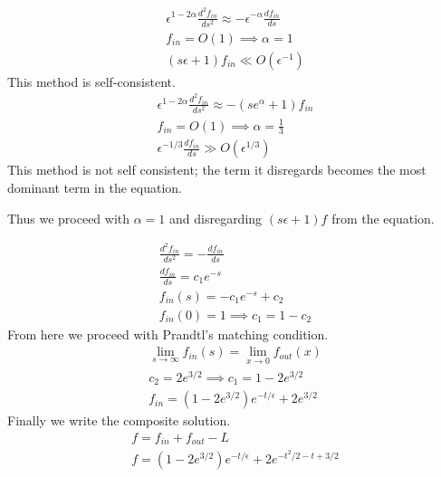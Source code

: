 \documentclass{article}
\begin{document}
\begin{enumerate}[label=\alph*.]
        \begin{gather*}
            \epsilon^{1-2\alpha}\frac{d^2f_{in}}{ds^2} \approx
            -\epsilon^{-\alpha}\frac{df_{in}}{ds} \\
            f_{in} = O(1) \implies \alpha = 1\\
            (s\epsilon + 1)f_{in} \ll O(\epsilon^{-1})
        \end{gather*}
        This method is self-consistent. 
    \emp
        \begin{gather*}
            \epsilon^{1-2\alpha}\frac{d^2f_{in}}{ds^2} \approx
            -(se^{\alpha} +1)f_{in}\\
            f_{in} = O(1) \implies \alpha = \frac{1}{3}\\
            \epsilon^{-1/3}\frac{df_{in}}{ds} \gg O(\epsilon^{1/3})
        \end{gather*}
        This method is not self consistent; the term it disregards becomes the
        most dominant term in the equation. 
    \emp

    Thus we proceed with $\alpha = 1$ and disregarding $(s\epsilon +1)f$ from
    the equation. 

    \begin{gather*}
        \frac{d^2f_{in}}{ds^2} = -\frac{df_{in}}{ds}\\
        \frac{df_{in}}{ds} = c_1e^{-s}\\
        f_{in}(s) = -c_1e^{-s} + c_2\\
        f_{in}(0) = 1 \implies c_1 = 1 - c_2
    \end{gather*}
    From here we proceed with Prandtl's matching condition.
    \begin{gather*}
        \lim_{s\to\infty} f_{in}(s) = \lim_{x\to0} f_{out}(x)\\
        c_2 = 2e^{3/2} \implies c_1 = 1 - 2e^{3/2}\\
        f_{in} = (1 - 2e^{3/2})e^{-t/\epsilon} + 2e^{3/2}
    \end{gather*}
    Finally we write the composite solution. 
    \begin{gather*}
        f = f_{in} + f_{out} - L\\
        f = (1 - 2e^{3/2})e^{-t/\epsilon} + 2e^{-t^2/2 - t + 3/2}
    \end{gather*}


\end{enumerate}
\end{document}

